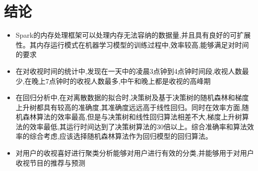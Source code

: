 \documentclass{hitreport}
\begin{document}
\section{结论}
\begin{itemize}
  \item Spark的内存处理框架可以处理内存无法容纳的数据量,并且具有良好的可扩展性。其内存运行模式在机器学习模型的训练过程中,效率较高,能够满足对时间的要求
  \item 在对收视时间的统计中,发现在一天中的凌晨3点钟到4点钟时间段,收视人数最少,在晚上7点钟时的收视人数最多,中午和晚上都是收视的高峰期
  \item 在回归分析中,在对离散数据的拟合时,决策树及基于决策树的随机森林和梯度上升树都具有较高的准确度,其准确度远远高于线性回归。同时在效率方面,随机森林算法的效率最高,但是与决策树和线性回归算法相差不大,梯度上升树算法的效率最低,其运行时间达到了决策树算法的30倍以上。综合准确率和算法效率的综合考虑,应该选择随机森林算法作为回归模型的回归算法。
  \item 对用户的收视喜好进行聚类分析能够对用户进行有效的分类,并能够用于对用户收视节目的推荐与预测
\end{itemize}
\end{document}
